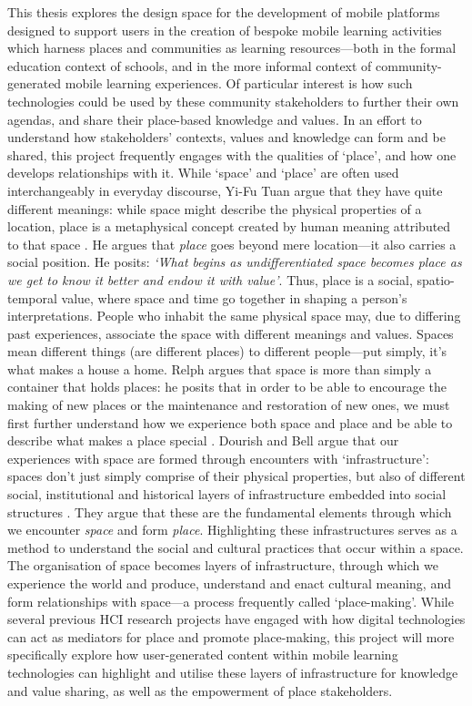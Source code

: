 This thesis explores the design space for the development of mobile platforms designed to support users in the creation of bespoke mobile learning activities which harness places and communities as learning resources---both in the formal education context of schools, and in the more informal context of community-generated mobile learning experiences. Of particular interest is how such technologies could be used by these community stakeholders to further their own agendas, and share their place-based knowledge and values. In an effort to understand how stakeholders' contexts, values and knowledge can form and be shared, this project frequently engages with the qualities of `place', and how one develops relationships with it. While ‘space’ and ‘place’ are often used interchangeably in everyday discourse, Yi-Fu Tuan argue that they have quite different meanings: while space might describe the physical properties of a location, place is a metaphysical concept created by human meaning attributed to that space \citep{Tuan1978}. He argues that \textit{place} goes beyond mere location---it also carries a social position. He posits: \textit{`What begins as undifferentiated space becomes place as we get to know it better and endow it with value'}. Thus, place is a social, spatio-temporal value, where space and time go together in shaping a person's interpretations. People who inhabit the same physical space may, due to differing past experiences, associate the space with different meanings and values. Spaces mean different things (are different places) to different people---put simply, it's what makes a house a home. Relph argues that space is more than simply a container that holds places: he posits that in order to be able to encourage the making of new places or the maintenance and restoration of new ones, we must first further understand how we experience both space and place and be able to describe what makes a place special \citep{Relph1976}. Dourish and Bell argue that our experiences with space are formed through encounters with `infrastructure': spaces don't just simply comprise of their physical properties, but also of different social, institutional and historical layers of infrastructure embedded into social structures \citep{Dourish2007}. They argue that these are the fundamental elements through which we encounter \textit{space} and form \textit{place}. Highlighting these infrastructures serves as a method to understand the social and cultural practices that occur within a space. The organisation of space becomes layers of infrastructure, through which we experience the world and produce, understand and enact cultural meaning, and form relationships with space---a process frequently called `place-making'. While several previous HCI research projects have engaged with how digital technologies can act as mediators for place and promote place-making, this project will more specifically explore how user-generated content within mobile learning technologies can highlight and utilise these layers of infrastructure for knowledge and value sharing, as well as the empowerment of place stakeholders.  

